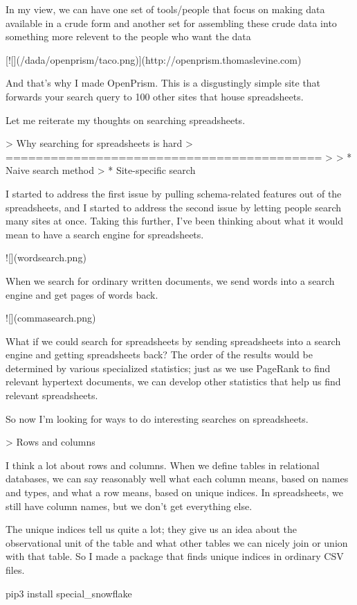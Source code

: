 \documentclass{acm_proc_article-sp}
\begin{document}
In my view, we can have one set of tools/people that focus on making
data available in a crude form and another set for assembling these crude
data into something more relevent to the people who want the data

[![](/dada/openprism/taco.png)](http://openprism.thomaslevine.com)

And that's why I made OpenPrism. This is a disgustingly simple site that
forwards your search query to 100 other sites that house spreadsheets.

Let me reiterate my thoughts on searching spreadsheets.

> Why searching for spreadsheets is hard
> ==========================================
>
> * Naive search method
> * Site-specific search


I started to address the first issue by pulling schema-related features out
of the spreadsheets, and I started to address the second issue by letting
people search many sites at once. Taking this further, I've been thinking
about what it would mean to have a search engine for spreadsheets.

![](wordsearch.png)

When we search for ordinary written documents, we send words into a search
engine and get pages of words back.

![](commasearch.png)

What if we could search for spreadsheets
by sending spreadsheets into a search engine and getting spreadsheets back?
The order of the results would be determined by various specialized statistics;
just as we use PageRank to find relevant hypertext documents, we can develop
other statistics that help us find relevant spreadsheets.

So now I'm looking for ways to do interesting searches on spreadsheets.

> Rows and columns

I think a lot about rows and columns. When we define tables in relational
databases, we can say reasonably well what each column means, based on
names and types, and what a row means, based on unique indices.
In spreadsheets, we still have column names, but we don't get everything
else.

The unique indices tell us quite a lot; they give us an idea about the
observational unit of the table and what other tables we can nicely
join or union with that table. So I made a package that finds unique
indices in ordinary CSV files.

    pip3 install special_snowflake
\end{document}
